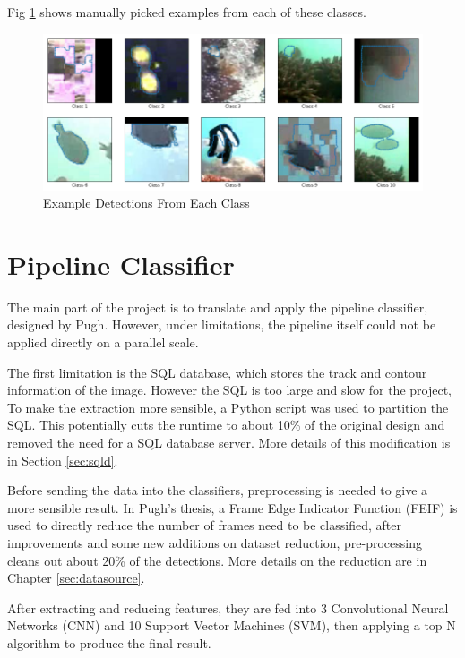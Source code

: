 \documentclass[bsc,logo,twoside,fullspacing,parskip]{infthesis}
\begin{document}
Fig \ref{fig:classes} shows manually picked examples from each of these classes.

\begin{figure}
    \centering
    \includegraphics[scale=0.44]{graph/class_sample.png}
    \caption{Example Detections From Each Class}
    \label{fig:classes}
\end{figure}

\section{Pipeline Classifier}

The main part of the project is to translate and apply the pipeline classifier, designed by Pugh\cite{P1}. 
However, under limitations, the pipeline itself could not be applied directly on a parallel scale.

The first limitation is the SQL database, which stores the track and contour information of the image. 
However the SQL is too large and slow for the project, To make the extraction more sensible, a Python script was used to partition the SQL.
This potentially cuts the runtime to about 10\% of the original design and removed the need for a SQL database server. 
More details of this modification is in Section \ref{sec:sqld}.

Before sending the data into the classifiers, preprocessing is needed to give a more sensible result.
In Pugh's thesis\cite{P1}, a Frame Edge Indicator Function (FEIF) is used to directly reduce the number of frames need to be classified, after improvements and some new additions on dataset reduction, pre-processing cleans out about 20\% of the detections. More details on the reduction are in Chapter \ref{sec:datasource}.

After extracting and reducing features, they are fed into 3 Convolutional Neural Networks (CNN) and 10 Support Vector Machines (SVM), then applying a top N algorithm to produce the final result. 
\end{document}

